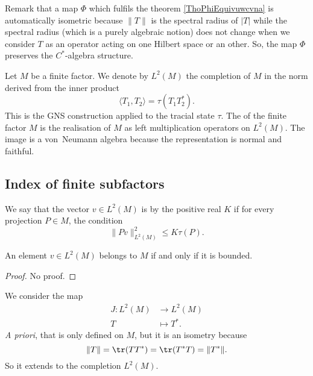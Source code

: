 Remark that a map $\Phi$ which fulfils the theorem \ref{ThoPhiEquivuwcvna} is automatically isometric because $\| T \|$ is the spectral radius of $| T |$ while the spectral radius (which is a purely algebraic notion) does not change when we consider $T$ as an operator acting on one Hilbert space or an other. So, the map $\Phi$ preserves the $C^*$-algebra structure.

Let $M$ be a finite factor. We denote by $L^2(M)$\label{PgLdM} the completion of $M$ in the norm derived  from the inner product
\begin{equation}
	\langle T_1, T_2\rangle =\tau(T_1T_2^*).
\end{equation}
This is the GNS construction applied to the tracial state $\tau$. The  of the finite factor $M$ is the realisation of $M$ as left multiplication operators on $L^2(M)$. The image is a von~Neumann algebra because the representation is normal and faithful. 


					\subsection{Index of finite subfactors}

We say that the vector $v\in L^2(M)$ is  by the positive real $K$ if for every projection $P\in M$, the condition
\begin{equation}
	\| Pv \|^2_{L^2(M)}\leq K\tau(P).
\end{equation}

\begin{lemma}
An element $v\in L^2(M)$ belongs to $M$ if and only if it is bounded.
\end{lemma}
\begin{proof}
No proof.
\end{proof}

We consider the map
\begin{equation}
\begin{aligned}
 J\colon L^2(M)&\to L^2(M) \\ 
   T&\mapsto T^*. 
\end{aligned}
\end{equation}
\emph{A priori}, that is only defined on $M$, but it is an isometry because
\begin{equation}
	\| T \|=\tr(TT^*)=\tr(T^*T)=\| T^* \|.
\end{equation}
So it extends to the completion $L^2(M)$.

